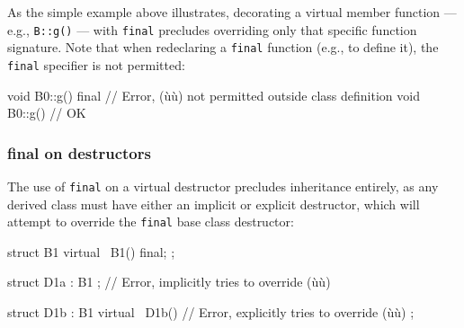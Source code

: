 \noindent As the simple example above illustrates, decorating a virtual member
function --- e.g., \lstinline!B::g()! --- with \lstinline!final! precludes
overriding only that specific function signature. Note that when
redeclaring a \lstinline!final! function (e.g., to define it), the
\lstinline!final! specifier is not permitted:

\begin{emcppslisting}
void B0::g() final { }  // Error, (ù{}ù) not permitted outside class definition
void B0::g() { }        // OK
\end{emcppslisting}
    

\subsubsection[\lstinline!final! on destructors]{{\SubsubsecCode final} on destructors}\label{final-on-destructors}

The use of \lstinline!final! on a virtual destructor precludes inheritance
entirely, as any derived class must have either an implicit or explicit
destructor, which will attempt to override the \lstinline!final! base class
destructor:

\begin{emcppslisting}
struct B1
{
    virtual ~B1() final;
};

struct D1a : B1 { };    // Error, implicitly tries to override (ù{}ù)

struct D1b : B1
{
    virtual ~D1b() { }  // Error, explicitly tries to override (ù{}ù)
};
\end{emcppslisting}
    

